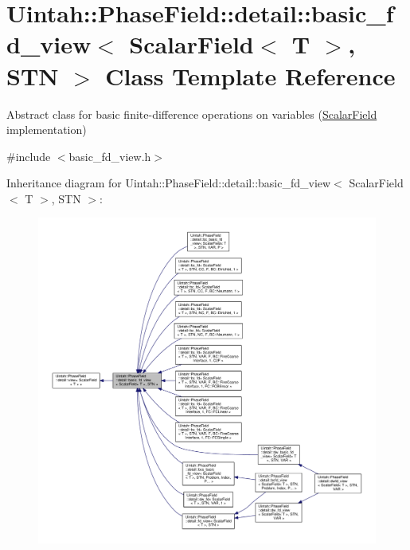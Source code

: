 \hypertarget{classUintah_1_1PhaseField_1_1detail_1_1basic__fd__view_3_01ScalarField_3_01T_01_4_00_01STN_01_4}{}\section{Uintah\+:\+:Phase\+Field\+:\+:detail\+:\+:basic\+\_\+fd\+\_\+view$<$ Scalar\+Field$<$ T $>$, S\+TN $>$ Class Template Reference}
\label{classUintah_1_1PhaseField_1_1detail_1_1basic__fd__view_3_01ScalarField_3_01T_01_4_00_01STN_01_4}


Abstract class for basic finite-\/difference operations on variables (\hyperlink{structUintah_1_1PhaseField_1_1ScalarField}{Scalar\+Field} implementation)  




{\ttfamily \#include $<$basic\+\_\+fd\+\_\+view.\+h$>$}



Inheritance diagram for Uintah\+:\+:Phase\+Field\+:\+:detail\+:\+:basic\+\_\+fd\+\_\+view$<$ Scalar\+Field$<$ T $>$, S\+TN $>$\+:\nopagebreak
\begin{figure}[H]
\begin{center}
\leavevmode
\includegraphics[width=350pt]{classUintah_1_1PhaseField_1_1detail_1_1basic__fd__view_3_01ScalarField_3_01T_01_4_00_01STN_01_4__inherit__graph}
\end{center}
\end{figure}


